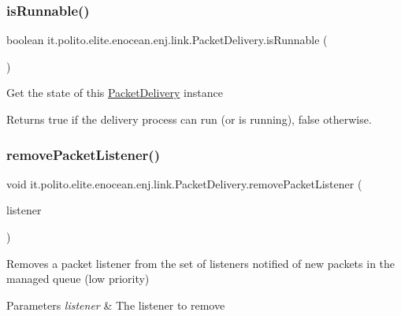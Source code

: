 \subsubsection{\texorpdfstring{is\+Runnable()}{isRunnable()}}
{\footnotesize\ttfamily boolean it.\+polito.\+elite.\+enocean.\+enj.\+link.\+Packet\+Delivery.\+is\+Runnable (\begin{DoxyParamCaption}{ }\end{DoxyParamCaption})}

Get the state of this \hyperlink{classit_1_1polito_1_1elite_1_1enocean_1_1enj_1_1link_1_1_packet_delivery}{Packet\+Delivery} instance

\begin{DoxyReturn}{Returns}
true if the delivery process can run (or is running), false otherwise. 
\end{DoxyReturn}
\hypertarget{classit_1_1polito_1_1elite_1_1enocean_1_1enj_1_1link_1_1_packet_delivery_aaf82bdb31064c39afa204baeca13e465}{}\label{classit_1_1polito_1_1elite_1_1enocean_1_1enj_1_1link_1_1_packet_delivery_aaf82bdb31064c39afa204baeca13e465} 
\subsubsection{\texorpdfstring{remove\+Packet\+Listener()}{removePacketListener()}}
{\footnotesize\ttfamily void it.\+polito.\+elite.\+enocean.\+enj.\+link.\+Packet\+Delivery.\+remove\+Packet\+Listener (\begin{DoxyParamCaption}\item[{\hyperlink{interfaceit_1_1polito_1_1elite_1_1enocean_1_1enj_1_1link_1_1_packet_listener}{Packet\+Listener}}]{listener }\end{DoxyParamCaption})}

Removes a packet listener from the set of listeners notified of new packets in the managed queue (low priority)


\begin{DoxyParams}{Parameters}
{\em listener} & The listener to remove \\
\hline
\end{DoxyParams}
\hypertarget{classit_1_1polito_1_1elite_1_1enocean_1_1enj_1_1link_1_1_packet_delivery_ababc40b5a33ae9f994d2fb3c0ad3095b}{}\label{classit_1_1polito_1_1elite_1_1enocean_1_1enj_1_1link_1_1_packet_delivery_ababc40b5a33ae9f994d2fb3c0ad3095b} 
